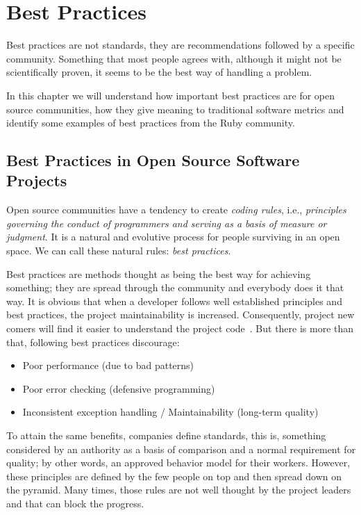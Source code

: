 \thispagestyle{empty}
\chapter{Best Practices}\label{chap:best_practices}

Best practices are not standards, they are recommendations followed by a specific community.
Something that most people agrees with, although it might not be scientifically proven,
it seems to be the best way of handling a problem.

In this chapter we will understand how important best practices are for open source communities, 
how they give meaning to traditional software metrics
and identify some examples of best practices from the Ruby community.


\section{Best Practices in Open Source Software Projects} \label{sec:best_practices_ossp}
Open source communities have a tendency to create \emph{coding rules},
i.e., \emph{principles governing the conduct of programmers and serving as a basis of measure or judgment}. 
It is a natural and evolutive process for people surviving in an open space.
We can call these natural rules: \emph{best practices}.

Best practices are  methods thought as being the  best way for achieving something;
they are spread through the community and everybody does it that way.
It is obvious that when a developer follows well established principles and best practices, 
the project maintainability is increased.
Consequently, project new comers will find it easier to understand the project code~\cite{dromey2002model}.
But there is more than that, following best practices discourage:
\begin{itemize}
\item Poor performance (due to bad patterns)
\item Poor error checking (defensive programming)
\item Inconsistent exception handling / Maintainability (long-term quality)
\end{itemize}

To attain the same benefits, companies define standards, this is, something considered by an authority 
as a basis of comparison and a normal requirement for quality;
by other words, an approved behavior model for their workers.
However, these principles are defined by the few people on top and then spread down on the pyramid.
Many times, those rules are not well thought by the project leaders and that can block the progress.

